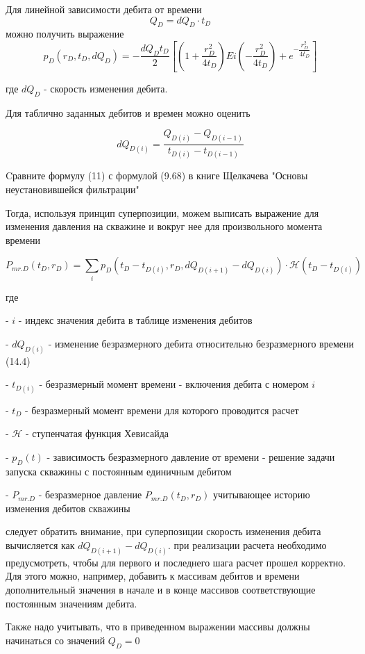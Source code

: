Для линейной зависимости дебита от времени 
$$
Q_D = dQ_D \cdot t_D 
$$
можно получить выражение
$$
p_D(r_D,t_D, dQ_D) =-\frac{dQ_D t_D }{2} \left[ \left( 1+ \frac{r_D^2}{4 t_D} \right) Ei \left(- \dfrac{r_D^2}{4t_D} \right) + e^{-\dfrac{r_D^2}{4t_D}} \right] $$ 

где $dQ_D$ - скорость изменения дебита.

Для таблично заданных дебитов и времен можно оценить 

$$
dQ_{D(i)} = \dfrac{Q_{D(i)}-Q_{D(i-1)}}{t_{D(i)} - t_{D(i-1)} } 
$$

Cравните формулу (11) с формулой (9.68) в книге Щелкачева "Основы неустановившейся фильтрации"

Тогда, используя принцип суперпозиции, можем выписать выражение для изменения давления на скважине и вокруг нее для произвольного момента времени

$$P_{mr.D}(t_D, r_D) = \sum_i  p_D\left(t_D-t_{D(i)}, r_D, dQ_{D(i+1)} - dQ_{D(i)}\right)\cdot \mathcal{H}(t_D-t_{D(i)}) $$

где

- $i$ - индекс значения дебита в таблице изменения дебитов

- $dQ_{D(i)}$ - изменение безразмерного дебита относительно безразмерного времени (14.4) 

- $t_{D(i)}$ - безразмерный момент времени - включения дебита с номером $i$

- $t_{D}$ - безразмерный момент времени для которого проводится расчет

- $\mathcal{H}$ - ступенчатая функция Хевисайда

- $p_D\left(t\right)$ - зависимость безразмерного давление от времени - решение задачи запуска скважины с постоянным единичным дебитом

- $P_{mr.D} $ - безразмерное давление $P_{mr.D}(t_D, r_D)$ учитывающее историю изменения дебитов скважины

следует обратить внимание, при суперпозиции скорость изменения дебита вычисляется как $dQ_{D(i+1)} - dQ_{D(i)}$.  при реализации расчета необходимо предусмотреть, чтобы для первого и последнего шага расчет прошел корректно. Для этого можно, например, добавить к массивам дебитов и времени дополнительный значения в начале и в конце массивов соответствующие постоянным значениям дебита. 

Также надо учитывать, что в приведенном выражении массивы должны начинаться со значений $Q_D=0$





